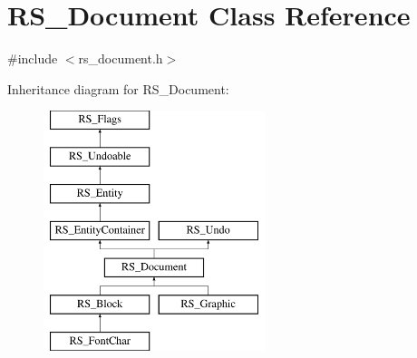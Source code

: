 \hypertarget{classRS__Document}{\section{R\-S\-\_\-\-Document Class Reference}
\label{classRS__Document}
}


{\ttfamily \#include $<$rs\-\_\-document.\-h$>$}

Inheritance diagram for R\-S\-\_\-\-Document\-:\begin{figure}[H]
\begin{center}
\leavevmode
\includegraphics[height=7.000000cm]{classRS__Document}
\end{center}
\end{figure}
